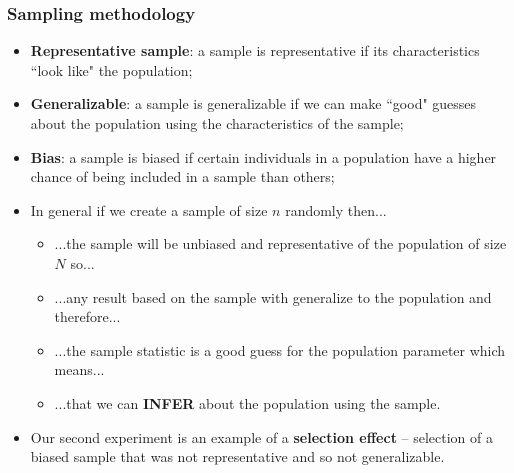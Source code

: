 \documentclass[aspectratio=169]{beamer}
\theoremstyle{principle}
\begin{document}
\begin{frame}
\frametitle{Sampling methodology}

\begin{itemize}
\item \textbf{Representative sample}: a sample is representative if its characteristics ``look like" the population;
\bigskip
\item \textbf{Generalizable}: a sample is generalizable if we can make ``good" guesses about the population using the characteristics of the sample;
\bigskip
\item \textbf{Bias}: a sample is biased if certain individuals in a population have a higher chance of being included in a sample than others;
\bigskip
\item[]\color{white} In general if we create a sample of size $n$ randomly then...
\begin{itemize}
\item[]\color{white} ...the sample will be unbiased and representative of the population of size $N$ so...
\item[]\color{white} ...any result based on the sample with generalize to the population and therefore...
\item[]\color{white} ...the sample statistic is a good guess for the population parameter which means...
\item[]\color{white} ...that we can \textbf{INFER} about the population using the sample.
\end{itemize}
\bigskip
\item[]\color{white} Our second experiment is an example of a \textbf{selection effect} -- selection of a biased sample that was not representative and so not generalizable.
\end{itemize}

\end{frame}
\end{document}
